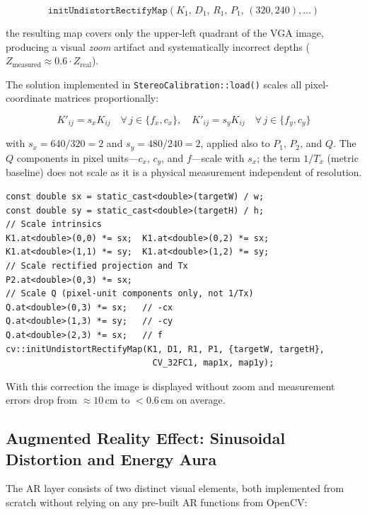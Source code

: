 \documentclass[12pt, a4paper]{article}
\begin{document}
\begin{equation}
\texttt{initUndistortRectifyMap}(K_1,\,D_1,\,R_1,\,P_1,\,(320,240),\ldots)
\end{equation}

\noindent the resulting map covers only the upper-left quadrant of the VGA image,
producing a visual \emph{zoom} artifact and systematically incorrect depths
($Z_{\text{measured}} \approx 0.6\cdot Z_{\text{real}}$).

The solution implemented in \texttt{StereoCalibration::load()} scales all
pixel-coordinate matrices proportionally:

\begin{equation}
\label{eq:vgascale}
  K'_{ij} = s_x K_{ij} \quad \forall\,j \in \{f_x, c_x\},\quad
  K'_{ij} = s_y K_{ij} \quad \forall\,j \in \{f_y, c_y\}
\end{equation}

\noindent with $s_x = 640/320 = 2$ and $s_y = 480/240 = 2$, applied also to
$P_1$, $P_2$, and $Q$. The $Q$ components in pixel units---$c_x$, $c_y$,
and $f$---scale with $s_x$; the term $1/T_x$ (metric baseline) does not scale
as it is a physical measurement independent of resolution.

\begin{lstlisting}[style=cppstyle, caption={Matrix scaling in StereoCalibration.cpp.}]
const double sx = static_cast<double>(targetW) / w;
const double sy = static_cast<double>(targetH) / h;
// Scale intrinsics
K1.at<double>(0,0) *= sx;  K1.at<double>(0,2) *= sx;
K1.at<double>(1,1) *= sy;  K1.at<double>(1,2) *= sy;
// Scale rectified projection and Tx
P2.at<double>(0,3) *= sx;
// Scale Q (pixel-unit components only, not 1/Tx)
Q.at<double>(0,3) *= sx;   // -cx
Q.at<double>(1,3) *= sy;   // -cy
Q.at<double>(2,3) *= sx;   // f
cv::initUndistortRectifyMap(K1, D1, R1, P1, {targetW, targetH},
                             CV_32FC1, map1x, map1y);
\end{lstlisting}

\noindent With this correction the image is displayed without zoom and measurement
errors drop from $\approx10$\,cm to $<0.6$\,cm on average.

\subsection{Augmented Reality Effect: Sinusoidal Distortion and Energy Aura}

The AR layer consists of two distinct visual elements, both implemented from scratch
without relying on any pre-built AR functions from OpenCV:
\end{document}
